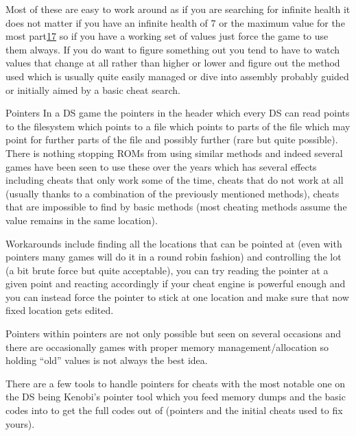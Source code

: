 \documentclass[
]{book}
\begin{document}
Most of these are easy to work around as if you are searching for infinite health it does not matter if you have an infinite health of 7 or the maximum value for the most part\href{romhacking202018.html\#fn17x0}{17} so if you have a working set of values just force the game to use them always. If you do want to figure something out you tend to have to watch values that change at all rather than higher or lower and figure out the method used which is usually quite easily managed or dive into assembly probably guided or initially aimed by a basic cheat search.

Pointers In a DS game the pointers in the header which every DS can read points to the filesystem which points to a file which points to parts of the file which may point for further parts of the file and possibly further (rare but quite possible). There is nothing stopping ROMs from using similar methods and indeed several games have been seen to use these over the years which has several effects including cheats that only work some of the time, cheats that do not work at all (usually thanks to a combination of the previously mentioned methods), cheats that are impossible to find by basic methods (most cheating methods assume the value remains in the same location).

Workarounds include finding all the locations that can be pointed at (even with pointers many games will do it in a round robin fashion) and controlling the lot (a bit brute force but quite acceptable), you can try reading the pointer at a given point and reacting accordingly if your cheat engine is powerful enough and you can instead force the pointer to stick at one location and make sure that now fixed location gets edited.

Pointers within pointers are not only possible but seen on several occasions and there are occasionally games with proper memory management/allocation so holding ``old'' values is not always the best idea.

There are a few tools to handle pointers for cheats with the most notable one on the DS being Kenobi's pointer tool which you feed memory dumps and the basic codes into to get the full codes out of (pointers and the initial cheats used to fix yours).
\end{document}
